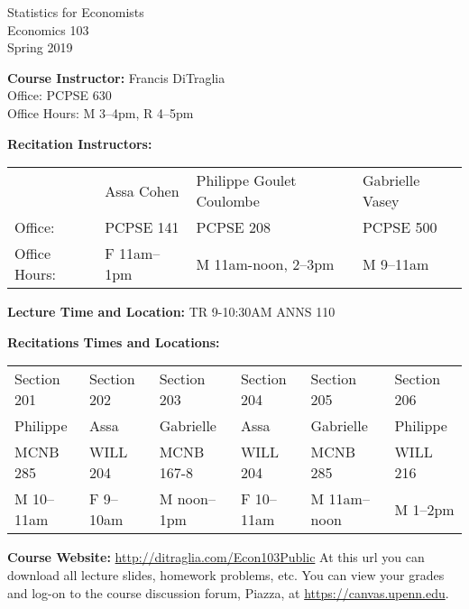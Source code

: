\documentclass[11pt, letterpaper]{article}
\begin{document}
\thispagestyle{plain}

\begin{center}
\Large
\sc
Statistics for Economists\\
\large
Economics 103\\
\large
Spring 2019
\end{center}



\normalsize

\noindent \textbf{Course Instructor:} Francis DiTraglia \\
Office: PCPSE 630\\
Office Hours: M 3--4pm, R 4--5pm

\medskip


\noindent \textbf{Recitation Instructors:}

\medskip
\noindent

\begin{tabular}{llll}
  & Assa Cohen & Philippe Goulet Coulombe & Gabrielle Vasey\\
Office:& PCPSE 141& PCPSE 208 & PCPSE 500 \\ 
Office Hours:& F 11am--1pm & M 11am-noon, 2--3pm & M 9--11am   
\end{tabular}

\medskip
 
\noindent \textbf{Lecture Time and Location:} TR 9-10:30AM ANNS 110 

\medskip

\noindent \textbf{Recitations Times and Locations:}
\medskip \noindent

\begin{tabular}{llllll}
	Section 201 & Section 202 & Section 203 & Section 204 & Section 205 & Section 206\\ 
  Philippe & Assa & Gabrielle & Assa & Gabrielle & Philippe \\
	MCNB 285 & WILL 204 & MCNB 167-8 & WILL 204 & MCNB 285 & WILL 216 \\ 
  M 10--11am & F 9--10am & M noon--1pm & F 10--11am & M 11am--noon & M 1--2pm
\end{tabular}


\medskip

\medskip
 
\noindent \textbf{Course Website:} \url{http://ditraglia.com/Econ103Public} At this url you can download all lecture slides, homework problems, etc.
You can view your grades and log-on to the course discussion forum, Piazza, at \url{https://canvas.upenn.edu}.
\end{document}
